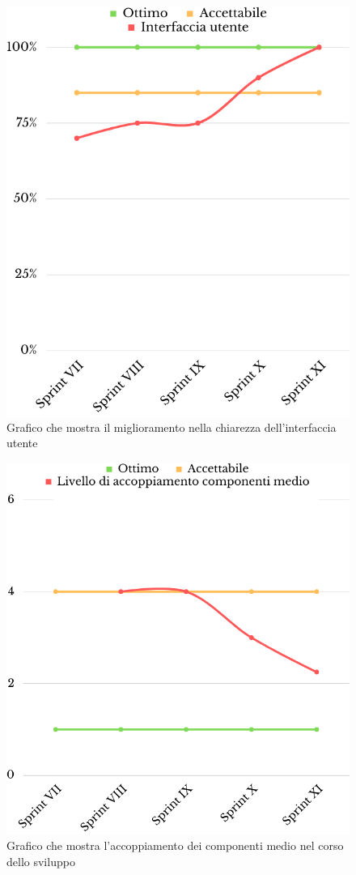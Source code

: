 \begin{figure}[H]
	\centering
	\includegraphics[scale=0.35]{img/interfaccia_utente.png}
	\caption{Grafico che mostra il miglioramento nella chiarezza dell'interfaccia utente}
\end{figure}
\begin{figure}[H]
	\centering
	\includegraphics[scale=0.35]{img/coupling.png}
	\caption{Grafico che mostra l'accoppiamento dei componenti medio nel corso dello sviluppo}
\end{figure}
